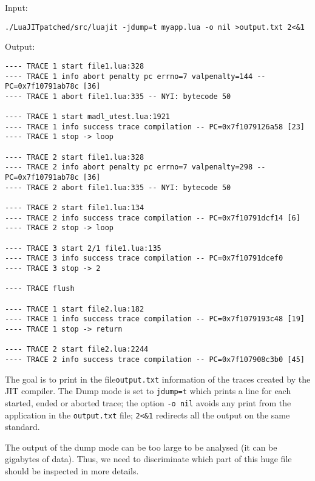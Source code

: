 \noindent
Input:

\begin{lstlisting}[style=CommandsLuaJIT]
  ./LuaJITpatched/src/luajit -jdump=t myapp.lua -o nil >output.txt 2<&1
\end{lstlisting}

\noindent
Output:
\begin{lstlisting}[style=CommandsLuaJIT]
---- TRACE 1 start file1.lua:328
---- TRACE 1 info abort penalty pc errno=7 valpenalty=144 -- PC=0x7f10791ab78c [36]
---- TRACE 1 abort file1.lua:335 -- NYI: bytecode 50

---- TRACE 1 start madl_utest.lua:1921
---- TRACE 1 info success trace compilation -- PC=0x7f1079126a58 [23]
---- TRACE 1 stop -> loop

---- TRACE 2 start file1.lua:328
---- TRACE 2 info abort penalty pc errno=7 valpenalty=298 -- PC=0x7f10791ab78c [36]
---- TRACE 2 abort file1.lua:335 -- NYI: bytecode 50

---- TRACE 2 start file1.lua:134
---- TRACE 2 info success trace compilation -- PC=0x7f10791dcf14 [6]
---- TRACE 2 stop -> loop

---- TRACE 3 start 2/1 file1.lua:135
---- TRACE 3 info success trace compilation -- PC=0x7f10791dcef0
---- TRACE 3 stop -> 2

---- TRACE flush

---- TRACE 1 start file2.lua:182
---- TRACE 1 info success trace compilation -- PC=0x7f1079193c48 [19]
---- TRACE 1 stop -> return

---- TRACE 2 start file2.lua:2244
---- TRACE 2 info success trace compilation -- PC=0x7f107908c3b0 [45]
\end{lstlisting}

\noindent
The goal is to print in the file\texttt{output.txt} information of the traces created by the JIT compiler. The Dump mode is set to \texttt{jdump=t} which prints a line for each started, ended or aborted trace; the option \texttt{-o nil} avoids any print from the application in the \texttt{output.txt} file; \texttt{2<\&1} redirects all the output on the same standard.

The output of the dump mode can be too large to be analysed (it can be gigabytes of data). Thus, we need to discriminate which part of this huge file should be inspected in more details. 


